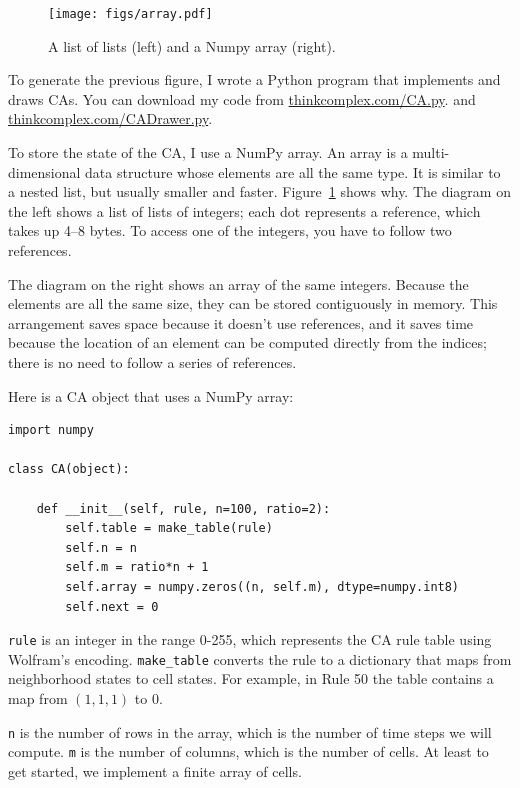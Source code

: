 \documentclass[10pt]{book}
\begin{document}
\begin{figure}
\centerline{\texttt{[image: figs/array.pdf]}}
\caption{A list of lists (left) and a Numpy array (right).\label{fig.array}}
\end{figure}

To generate the previous figure, I wrote a Python program that
implements and draws CAs.
You can download my code from \url{thinkcomplex.com/CA.py}.
and \url{thinkcomplex.com/CADrawer.py}.

To store the state of the CA, I use a NumPy array.  An array is a
multi-dimensional data structure whose elements are all the same type.
It is similar to a nested list, but usually smaller and faster.  
Figure~\ref{fig.array} shows why.
The diagram on the left shows a list of lists of integers; each
dot represents a reference, which takes up 4--8 bytes.  To access
one of the integers, you have to follow two references.

The diagram on the right shows an array of the same integers.  Because
the elements are all the same size, they can be stored contiguously in
memory.  This arrangement saves space because it doesn't use
references, and it saves time because the location of an element can
be computed directly from the indices; there is no need to follow a
series of references.

Here is a CA object that uses a NumPy array:

\begin{verbatim}
import numpy

class CA(object):

    def __init__(self, rule, n=100, ratio=2):
        self.table = make_table(rule)
        self.n = n
        self.m = ratio*n + 1
        self.array = numpy.zeros((n, self.m), dtype=numpy.int8)
        self.next = 0
\end{verbatim}

{\tt rule} is an integer in the range 0-255, which represents the
CA rule table using Wolfram's encoding.  \verb"make_table" converts
the rule to a dictionary that maps from neighborhood states to cell
states.  For example, in Rule 50 the table contains a map from
$(1,1,1)$ to 0.

{\tt n} is the number of rows in the array, which is the number
of time steps we will compute.  {\tt m} is the number of columns,
which is the number of cells.  At least to get started, we implement
a finite array of cells.
\end{document}
